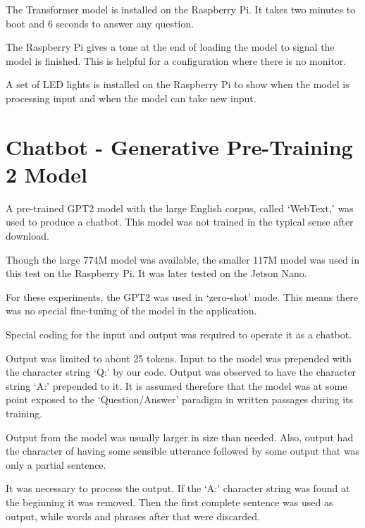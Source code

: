 The Transformer model is installed on the Raspberry Pi. It takes two minutes to boot and 6 seconds to answer any question. 

The Raspberry Pi gives a tone at the end of loading the model to signal the model is finished. %
This is helpful for a configuration where there is no monitor.

A set of LED lights is installed on the Raspberry Pi to show when the model is processing input and when the model can take new input. %


\section{Chatbot - Generative Pre-Training 2 Model}

\label{install-gpt2-chatbot}
A pre-trained GPT2 model with the large English corpus, called `WebText,' was used to produce a chatbot. %
This model was not trained in the typical sense after download. 

Though the large 774M model was available, the smaller 117M model was used in this test on the Raspberry Pi. It was later tested on the Jetson Nano.

For these experiments, the GPT2 was used in `zero-shot' mode. This means there was no special fine-tuning of the model in the application.

Special coding for the input and output was required to operate it as a chatbot. 

Output was limited to about 25 tokens. Input to the model was prepended with the character string `Q:' by our code. Output was observed to have the character string `A:' prepended to it. It is assumed therefore that the model was at some point exposed to the `Question/Answer' paradigm in written passages during its training. %

Output from the model was usually larger in size than needed. Also, output had the character of having some sensible utterance followed by some output that was only a partial sentence.

It was necessary to process the output. 
If the `A:' character string was found at the beginning it was removed.
Then the first complete sentence was used as output, while words and phrases after that were discarded.

